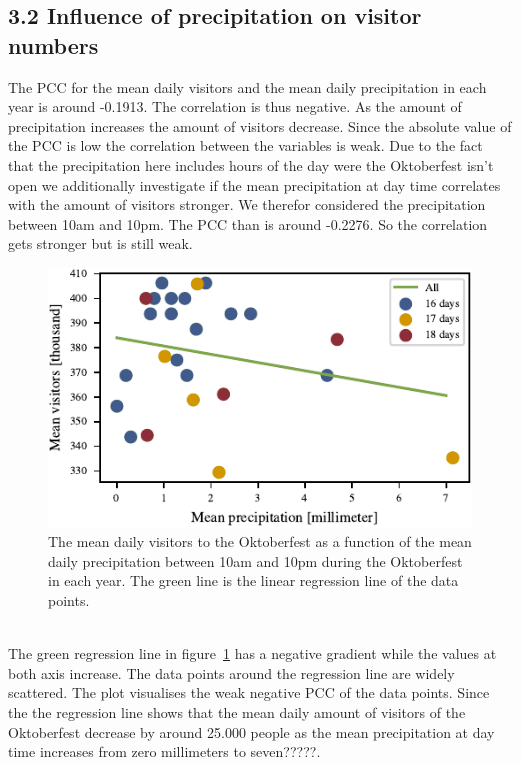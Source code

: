\documentclass{article}
\theoremstyle{plain}
\theoremstyle{definition}
\theoremstyle{remark}
\begin{document}
\subsection*{3.2 Influence of precipitation on visitor numbers}
The PCC for the mean daily visitors and the mean daily precipitation in each year is around -0.1913. The correlation is thus negative. As the amount of precipitation increases the amount of visitors decrease. Since the absolute value of the PCC is low the correlation between the variables is weak. Due to the fact that the precipitation here includes hours of the day were the Oktoberfest isn't open we additionally investigate if the mean precipitation at day time correlates with the amount of visitors stronger. We therefor considered the precipitation between 10am and 10pm. The PCC than is around -0.2276. So the correlation gets stronger but is still weak.
\begin{figure}[ht]%
  \includegraphics{fig/totalprecipitation.pdf}
  \caption{The mean daily visitors to the Oktoberfest as a function of the mean daily precipitation between 10am and 10pm during the Oktoberfest in each year. The green line is the linear regression line of the data points.}
  \label{figure_precipitation}
\end{figure}\\
\noindent
The green regression line in figure~\ref{figure_precipitation} has a negative gradient while the values at both axis increase. The data points around the regression line are widely scattered. The plot visualises the weak negative PCC of the data points. Since the the regression line shows that the mean daily amount of visitors of the Oktoberfest decrease by around 25.000 people as the mean precipitation at day time increases from zero millimeters to seven?????.\\
\end{document}
